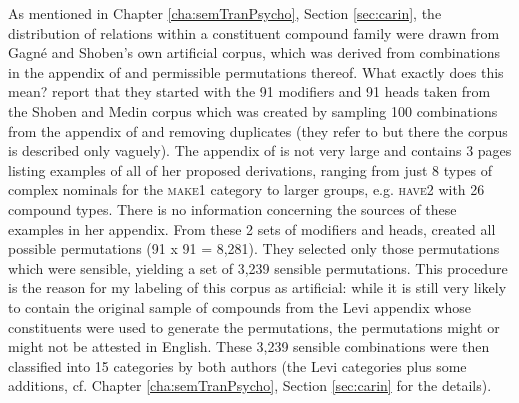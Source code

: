 As mentioned in Chapter \ref{cha:semTranPsycho}, Section
\ref{sec:carin}, the distribution of relations within a constituent
compound family
were drawn from Gagné and Shoben's own artificial corpus, which was derived from
combinations in the appendix of \citet{Levi:1978} and permissible
permutations thereof. What exactly does this mean? 
\citet[74]{GagneandShoben:1997} report that they
started with the 91 modifiers and 91 heads taken from the Shoben and Medin corpus
which was created by sampling
100 combinations from the appendix of \citet{Levi:1978} and removing
duplicates (they refer to \citealt{Shoben:1991} but there the
corpus is described only vaguely). %
The appendix of \citet{Levi:1978} is not very
large and contains 3 pages listing examples of all of her proposed
derivations, ranging from just 8 types of complex nominals for the
\textsc{make1} category to larger groups, e.g. \textsc{have2} with 26
compound types. There is no information concerning the sources of
these examples in her appendix. 
From these 2 sets of modifiers and heads, \citet[74]{GagneandShoben:1997} created all possible permutations (91
x 91 = 8,281). They selected only those permutations which were
sensible, yielding a set of 3,239 sensible permutations. This
procedure is the reason for my labeling of this corpus as artificial:
while it is still very likely to contain the original sample of
 compounds from the Levi appendix whose constituents were used to
generate the permutations, the permutations might or might not be
attested in English. These 3,239
sensible combinations were
then 
classified into 15 categories by both authors (the Levi categories
plus some additions, cf. Chapter \ref{cha:semTranPsycho}, Section \ref{sec:carin} for the details).
